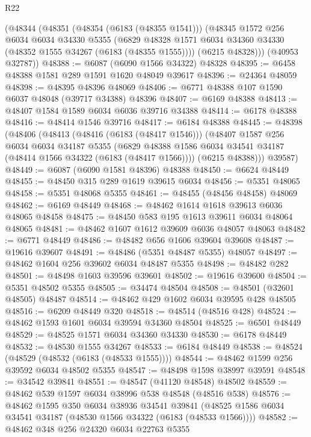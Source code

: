 \begin{lexlean}{R22}
\begin{coremodule}
    (@48344
      (@48351
        (@48354 (@6183 (@48355 @1541)))
        (@48345
          @1572
          @256
          @6034
          @6034
          @34330
          @5355
          (@6829 @48328 @1571 @6034 @34360 @34330 (@48352 @1555 @34267 (@6183 (@48355 @1555))))
          (@6215 @48328)))
      (@40953 @32787))
@48388 := @6087 (@6090 @1566 @34322) @48328
@48395 := @6458 @48388 @1581 @289 @1591 @1620 @48049 @39617
@48396 := @24364 @48059
@48398 := @48395 @48396 @48069
@48406 := @6771 @48388 @107 @1590 @6037 @48048 (@39717 @34388) @48396
@48407 := @6169 @48388
@48413 := @48407 @1584 @1589 @6034 @6036 @39716 @34388
@48414 := @6178 @48388
@48416 := @48414 @1546 @39716
@48417 := @6184 @48388
@48445 := @48398
    (@48406
      (@48413
        (@48416 (@6183 (@48417 @1546)))
        (@48407
          @1587
          @256
          @6034
          @6034
          @34187
          @5355
          (@6829 @48388 @1586 @6034 @34541 @34187 (@48414 @1566 @34322 (@6183 (@48417 @1566))))
          (@6215 @48388)))
      @39587)
@48449 := @6087 (@6090 @1581 @48396) @48388
@48450 := @6624 @48449
@48455 := @48450 @315 @289 @1619 @39615 @6034
@48456 := @5351 @48065
@48458 := @5351 @48068 @5355
@48461 := @48455 (@48456 @48458) @48069
@48462 := @6169 @48449
@48468 := @48462 @1614 @1618 @39613 @6036 @48065 @48458
@48475 := @48450 @583 @195 @1613 @39611 @6034 @48064 @48065
@48481 := @48462 @1607 @1612 @39609 @6036 @48057 @48063
@48482 := @6771 @48449
@48486 := @48482 @656 @1606 @39604 @39608
@48487 := @19616 @39607
@48491 := @48486 (@5351 @48487 @5355) @48057
@48497 := @48462 @1604 @256 @39602 @6034 @48487 @5355
@48498 := @48482 @282
@48501 := @48498 @1603 @39596 @39601
@48502 := @19616 @39600
@48504 := @5351 @48502 @5355
@48505 := @34474 @48504
@48508 := @48501 (@32601 @48505) @48487
@48514 := @48462 @429 @1602 @6034 @39595 @428 @48505
@48516 := @6209 @48449 @320
@48518 := @48514 (@48516 @428)
@48524 := @48462 @1593 @1601 @6034 @39594 @34360 @48504
@48525 := @6501 @48449
@48529 := @48525 @1571 @6034 @34360 @34330
@48530 := @6178 @48449
@48532 := @48530 @1555 @34267
@48533 := @6184 @48449
@48538 := @48524 (@48529 (@48532 (@6183 (@48533 @1555))))
@48544 := @48462 @1599 @256 @39592 @6034 @48502 @5355
@48547 := @48498 @1598 @38997 @39591
@48548 := @34542 @39841
@48551 := @48547 (@41120 @48548) @48502
@48559 := @48462 @539 @1597 @6034 @38996 @538 @48548 (@48516 @538)
@48576 := @48462
    @1595
    @350
    @6034
    @38936
    @34541
    @39841
    (@48525 @1586 @6034 @34541 @34187 (@48530 @1566 @34322 (@6183 (@48533 @1566))))
@48582 := @48462 @348 @256 @24320 @6034 @22763 @5355

\end{coremodule}
\end{lexlean}
